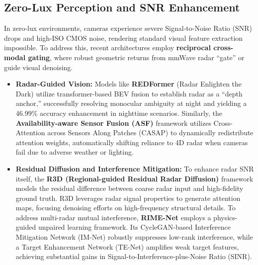 \documentclass[conference]{IEEEtran}
\begin{document}
\subsection{Zero-Lux Perception and SNR Enhancement}
In zero-lux environments, cameras experience severe Signal-to-Noise Ratio (SNR) drops and high-ISO CMOS noise, rendering standard visual feature extraction impossible. To address this, recent architectures employ \textbf{reciprocal cross-modal gating}, where robust geometric returns from mmWave radar ``gate'' or guide visual denoising. 

\begin{itemize}
    \item \textbf{Radar-Guided Vision:} Models like \textbf{REDFormer} (Radar Enlighten the Dark) utilize transformer-based BEV fusion to establish radar as a ``depth anchor,'' successfully resolving monocular ambiguity at night and yielding a 46.99\% accuracy enhancement in nighttime scenarios. Similarly, the \textbf{Availability-aware Sensor Fusion (ASF)} framework utilizes Cross-Attention across Sensors Along Patches (CASAP) to dynamically redistribute attention weights, automatically shifting reliance to 4D radar when cameras fail due to adverse weather or lighting.
    \item \textbf{Residual Diffusion and Interference Mitigation:} To enhance radar SNR itself, the \textbf{R3D (Regional-guided Residual Radar Diffusion)} framework models the residual difference between coarse radar input and high-fidelity ground truth. R3D leverages radar signal properties to generate attention maps, focusing denoising efforts on high-frequency structural details. To address multi-radar mutual interference, \textbf{RIME-Net} employs a physics-guided unpaired learning framework. Its CycleGAN-based Interference Mitigation Network (IM-Net) robustly suppresses low-rank interference, while a Target Enhancement Network (TE-Net) amplifies weak target features, achieving substantial gains in Signal-to-Interference-plus-Noise Ratio (SINR).
\end{itemize}
\end{document}
